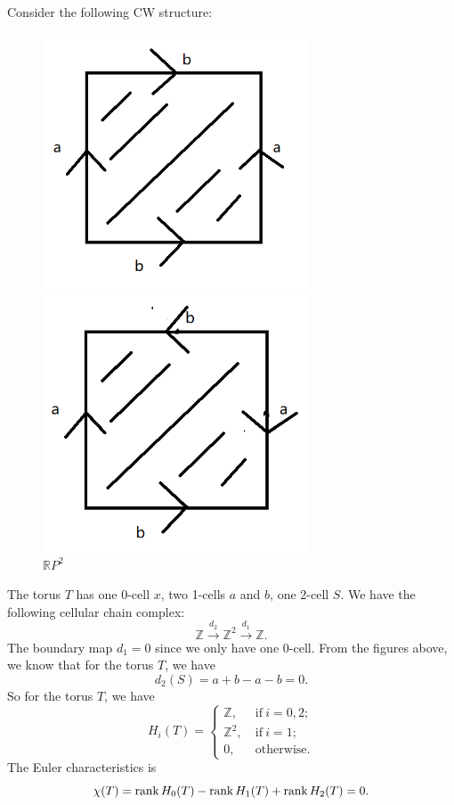 \documentclass[a4paper, 12pt]{article}
\begin{document}
\begin{solution}
\begin{enumerate}[(1)]
Consider the following CW structure:
\begin{figure}[h]
    \centering
    \begin{minipage}[b]{0.4\textwidth}
      \includegraphics[width=0.7\textwidth]{Pictures/HW1-1-1.png}
      \caption{\(T\)}
    \end{minipage}
    \hfill
    \begin{minipage}[b]{0.4\textwidth}
      \includegraphics[width=0.7\textwidth]{Pictures/HW1-1-2.png}
      \caption{\(\mathbb{R}P^2\)}
    \end{minipage}
  \end{figure}
The torus \(T\) has one 0-cell \(x\), two 1-cells \(a\) and \(b\), one 2-cell \(S\). We have the following cellular chain complex:
\[\mathbb{Z}\xrightarrow{d_2}\mathbb{Z}^2\xrightarrow{d_1}\mathbb{Z}.\]
The boundary map \(d_1=0\) since we only have one 0-cell. From the figures above, we know that for the torus \(T\), we have 
\[d_2(S)=a+b-a-b=0.\]
So for the torus \(T\), we have 
\[H_i(T)=\begin{cases}
    \mathbb{Z},&\ \text{if}\ i=0,2;\\ 
    \mathbb{Z}^2,&\ \text{if}\ i=1;\\ 
    0,&\ \text{otherwise}.
\end{cases}\]
The Euler characteristics is 
\[\chi(T)=\text{rank}\, H_0(T)-\text{rank}\, H_1(T)+\text{rank}\, H_2(T)=0.\]


\end{enumerate}
\end{solution}
\end{document}
